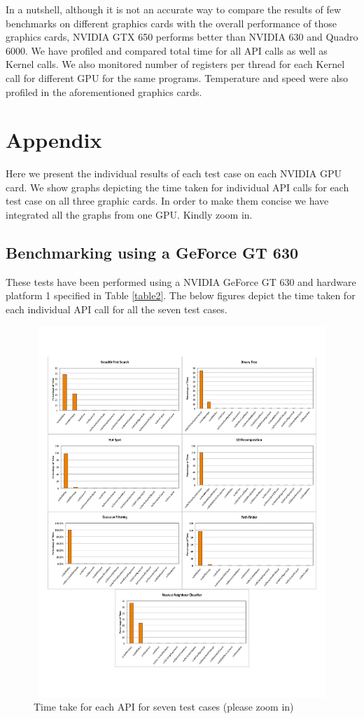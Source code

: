 \documentclass[paper=a4, fontsize=11pt]{scrartcl}
\numberwithin{equation}{section}		%
\numberwithin{figure}{section}			%
\numberwithin{table}{section}				%
\begin{document}
In a nutshell, although it is not an accurate way to compare the results of few benchmarks on different graphics cards with the overall performance of those graphics cards, NVIDIA GTX 650 performs better than NVIDIA 630 and Quadro 6000. We have profiled and compared total time for all API calls as well as Kernel calls. We also monitored number of registers per thread for each Kernel call for different GPU for the same programs. Temperature and speed were also profiled in the aforementioned graphics cards.

\newpage
\section{Appendix}

Here we present the individual results of each test case on each NVIDIA GPU card. We show graphs depicting the time taken for individual API calls for each test case on all three graphic cards. In order to make them concise we have integrated all the graphs from one GPU. Kindly zoom in. 

\subsection{Benchmarking using a GeForce GT 630}
These tests have been performed using a NVIDIA GeForce GT 630 and hardware platform 1 specified in Table \ref{table2}. The below figures depict the time taken for each individual API call for all the seven test cases.  

\begin{figure}[!h]
\centering
\includegraphics[width=1\textwidth,height=14cm]{../imgs/x630.pdf}
\caption{Time take for each API for seven test cases (please zoom in)}
\label{fig:x630}
\end{figure}
\end{document}
